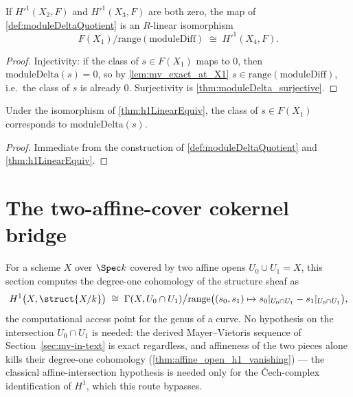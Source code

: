 \begin{theorem}
  \label{thm:h1LinearEquiv}
  \leanok
  If \(H'^1(X_2,F)\) and \(H'^1(X_3,F)\) are both zero, the map of
  \ref{def:moduleDeltaQuotient} is an \(R\)-linear isomorphism
  \[
    F(X_1)/\mathrm{range}(\mathrm{moduleDiff}) \;\cong\; H'^1(X_4,F).
  \]
\end{theorem}
\begin{proof}
  \leanok
  Injectivity: if the class of \(s \in F(X_1)\) maps to \(0\), then
  \(\mathrm{moduleDelta}(s) = 0\), so by \ref{lem:mv_exact_at_X1}
  \(s \in \mathrm{range}(\mathrm{moduleDiff})\), i.e.\ the class of \(s\) is already \(0\).
  Surjectivity is \ref{thm:moduleDelta_surjective}.
\end{proof}

\begin{lemma}
  \label{lem:h1LinearEquiv_mk}
  \leanok
  Under the isomorphism of \ref{thm:h1LinearEquiv}, the class of \(s \in F(X_1)\)
  corresponds to \(\mathrm{moduleDelta}(s)\).
\end{lemma}
\begin{proof}
  \leanok
  Immediate from the construction of \ref{def:moduleDeltaQuotient} and
  \ref{thm:h1LinearEquiv}.
\end{proof}

\section{The two-affine-cover cokernel bridge}

For a scheme \(X\) over \(\Spec k\) covered by two affine opens \(U_0 \cup U_1 = X\), this
section computes the degree-one cohomology of the structure sheaf as
\[
  H^1\bigl(X, \struct{X/k}\bigr) \;\cong\;
    \Gamma(X, U_0 \cap U_1) \big/
      \mathrm{range}\bigl((s_0,s_1) \mapsto s_0|_{U_0 \cap U_1} - s_1|_{U_0 \cap U_1}\bigr),
\]
the computational access point for the genus of a curve. No hypothesis on the intersection
\(U_0 \cap U_1\) is needed: the derived Mayer--Vietoris sequence of Section~\ref{sec:mv-in-text}
is exact regardless, and affineness of the two pieces alone kills their degree-one
cohomology (\ref{thm:affine_open_h1_vanishing}) --- the classical affine-intersection
hypothesis is needed only for the \v{C}ech-complex identification of \(H^1\), which this
route bypasses.

